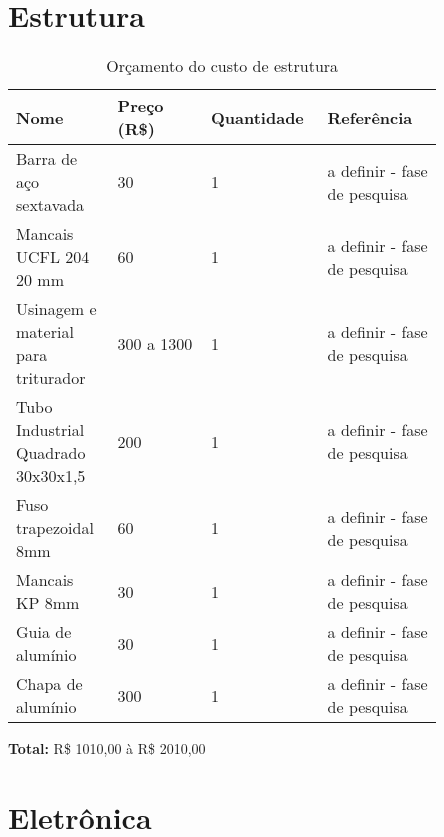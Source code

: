 \section{Estrutura}

\begin{table}[!ht]
\centering
\caption{Orçamento do custo de estrutura}
\label{my-label}
\begin{tabular}{|p{0.20\linewidth}|p{0.20\linewidth}|p{0.20\linewidth}|p{0.25\linewidth}|}
\hline
\textbf{Nome}                       & \textbf{Preço (R\$)} & \textbf{Quantidade} & \textbf{Referência} \\ \hline
Barra de aço sextavada              & 30                   & 1                   & a definir - fase de pesquisa                    \\ \hline
Mancais UCFL 204 20 mm              & 60                   & 1                   & a definir - fase de pesquisa                    \\ \hline
Usinagem e material para triturador & 300 a 1300           & 1                   & a definir - fase de pesquisa                    \\ \hline
Tubo Industrial Quadrado 30x30x1,5  & 200                  & 1                   & a definir - fase de pesquisa                    \\ \hline
Fuso trapezoidal 8mm                & 60                   & 1                   & a definir - fase de pesquisa                    \\ \hline
Mancais KP 8mm                      & 30                   & 1                   & a definir - fase de pesquisa                    \\ \hline
Guia de alumínio                    & 30                   & 1                   & a definir - fase de pesquisa                    \\ \hline
Chapa de alumínio                   & 300                  & 1                   & a definir - fase de pesquisa                    \\ \hline
\end{tabular}
\end{table}

\textbf{Total: } R\$ 1010,00 à R\$ 2010,00

\section{Eletrônica}

